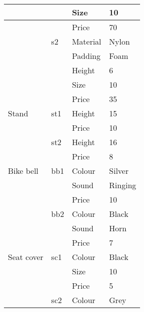 \begin{longtable}[c]{|l|l|l|l|}
                       &                & Size           & 10              \\ \hline
                       &                & Price          & 70              \\ \hline
                       & s2             & Material       & Nylon           \\ \hline
                       &                & Padding        & Foam            \\ \hline
                       &                & Height         & 6               \\ \hline
                       &                & Size           & 10              \\ \hline
                       &                & Price          & 35              \\ \hline
Stand                  & st1            & Height         & 15              \\ \hline
                       &                & Price          & 10              \\ \hline
                       & st2            & Height         & 16              \\ \hline
                       &                & Price          & 8               \\ \hline
Bike bell              & bb1            & Colour         & Silver          \\ \hline
                       &                & Sound          & Ringing         \\ \hline
                       &                & Price          & 10              \\ \hline
                       & bb2            & Colour         & Black           \\ \hline
                       &                & Sound          & Horn            \\ \hline
                       &                & Price          & 7               \\ \hline
Seat cover             & sc1            & Colour         & Black           \\ \hline
                       &                & Size           & 10              \\ \hline
                       &                & Price          & 5               \\ \hline
                       & sc2            & Colour         & Grey            \\ \hline

\end{longtable}
